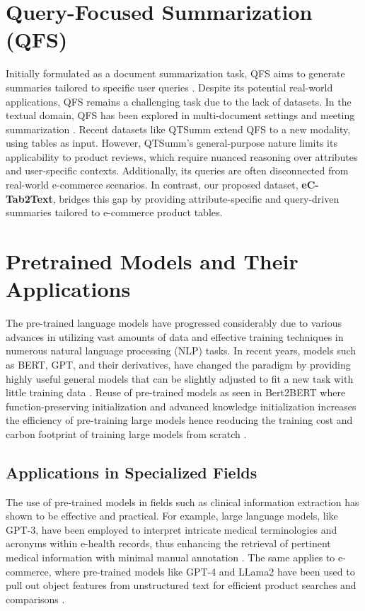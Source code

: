 \section{Query-Focused Summarization (QFS)}
Initially formulated as a document summarization task, QFS aims to generate summaries tailored to specific user queries \cite{dang-2006-duc}. Despite its potential real-world applications, QFS remains a challenging task due to the lack of datasets. In the textual domain, QFS has been explored in multi-document settings \cite{giorgi-etal-2023-open} and meeting summarization \cite{zhong-etal-2021-qmsum}. Recent datasets like QTSumm \cite{zhao2023qtsummqueryfocusedsummarizationtabular} extend QFS to a new modality, using tables as input. However, QTSumm's general-purpose nature limits its applicability to product reviews, which require nuanced reasoning over attributes and user-specific contexts. Additionally, its queries are often disconnected from real-world e-commerce scenarios. In contrast, our proposed dataset, \textbf{eC-Tab2Text}, bridges this gap by providing attribute-specific and query-driven summaries tailored to e-commerce product tables.
\section{Pretrained Models and Their Applications}
The pre-trained language models have progressed considerably due to various advances in utilizing vast amounts of data and effective training techniques in numerous natural language processing (NLP) tasks. In recent years, models such as BERT, GPT, and their derivatives, have changed the paradigm by providing highly useful general models that can be slightly adjusted to fit a new task with little training data \citep{chen-etal-2022-bert2bert}. Reuse of pre-trained models as seen in Bert2BERT where function-preserving initialization and advanced knowledge initialization increases the efficiency of pre-training large models hence reoducing the training cost and carbon footprint of training large models from scratch \citep{chen-etal-2022-bert2bert}.

\subsection{Applications in Specialized Fields}
The use of pre-trained models in fields such as clinical information extraction has shown to be effective and practical. For example, large language models, like GPT-3, have been employed to interpret intricate medical terminologies and acronyms within e-health records, thus enhancing the retrieval of pertinent medical information with minimal manual annotation \citep{agrawal2022large}. The same applies to e-commerce, where pre-trained models like GPT-4 and LLama2 have been used to pull out object features from unstructured text for efficient product searches and comparisons \citep{brinkmann2024product}. 

